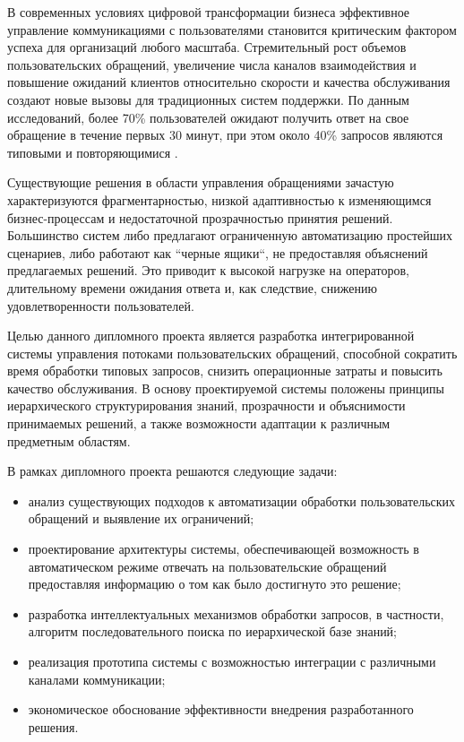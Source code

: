
В современных условиях цифровой трансформации бизнеса эффективное управление коммуникациями с пользователями становится критическим фактором успеха для организаций любого масштаба. Стремительный рост объемов пользовательских обращений, увеличение числа каналов взаимодействия и повышение ожиданий клиентов относительно скорости и качества обслуживания создают новые вызовы для традиционных систем поддержки. По данным исследований, более 70\% пользователей ожидают получить ответ на свое обращение в течение первых 30 минут, при этом около 40\% запросов являются типовыми и повторяющимися \cite{gladlyReport}.

Существующие решения в области управления обращениями зачастую характеризуются фрагментарностью, низкой адаптивностью к изменяющимся бизнес-процессам и недостаточной прозрачностью принятия решений. Большинство систем либо предлагают ограниченную автоматизацию простейших сценариев, либо работают как ``черные ящики``, не предоставляя объяснений предлагаемых решений. Это приводит к высокой нагрузке на операторов, длительному времени ожидания ответа и, как следствие, снижению удовлетворенности пользователей.

Целью данного дипломного проекта является разработка интегрированной системы управления потоками пользовательских обращений, способной  сократить время обработки типовых запросов, снизить операционные затраты и повысить качество обслуживания. В основу проектируемой системы положены принципы иерархического структурирования знаний, прозрачности и объяснимости принимаемых решений, а также возможности адаптации к различным предметным областям.

В рамках дипломного проекта решаются следующие задачи:

\begin{itemize}
\item анализ существующих подходов к автоматизации обработки пользовательских обращений и выявление их ограничений;
\item проектирование архитектуры системы, обеспечивающей возможность в автоматическом режиме отвечать на пользовательские обращений предоставляя информацию о том как было достигнуто это решение;
\item разработка интеллектуальных механизмов обработки запросов, в частности, алгоритм последовательного поиска по иерархической базе знаний;
\item реализация прототипа системы с возможностью интеграции с различными каналами коммуникации;
\item экономическое обоснование эффективности внедрения разработанного решения.
\end{itemize}

